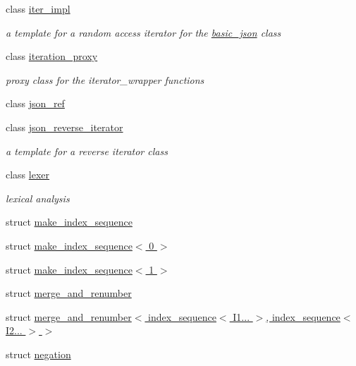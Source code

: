 \begin{DoxyCompactItemize}
\item 
class \hyperlink{classnlohmann_1_1detail_1_1iter__impl}{iter\+\_\+impl}
\begin{DoxyCompactList}\small\item\em a template for a random access iterator for the \hyperlink{classnlohmann_1_1basic__json}{basic\+\_\+json} class \end{DoxyCompactList}\item 
class \hyperlink{classnlohmann_1_1detail_1_1iteration__proxy}{iteration\+\_\+proxy}
\begin{DoxyCompactList}\small\item\em proxy class for the iterator\+\_\+wrapper functions \end{DoxyCompactList}\item 
class \hyperlink{classnlohmann_1_1detail_1_1json__ref}{json\+\_\+ref}
\item 
class \hyperlink{classnlohmann_1_1detail_1_1json__reverse__iterator}{json\+\_\+reverse\+\_\+iterator}
\begin{DoxyCompactList}\small\item\em a template for a reverse iterator class \end{DoxyCompactList}\item 
class \hyperlink{classnlohmann_1_1detail_1_1lexer}{lexer}
\begin{DoxyCompactList}\small\item\em lexical analysis \end{DoxyCompactList}\item 
struct \hyperlink{structnlohmann_1_1detail_1_1make__index__sequence}{make\+\_\+index\+\_\+sequence}
\item 
struct \hyperlink{structnlohmann_1_1detail_1_1make__index__sequence_3_010_01_4}{make\+\_\+index\+\_\+sequence$<$ 0 $>$}
\item 
struct \hyperlink{structnlohmann_1_1detail_1_1make__index__sequence_3_011_01_4}{make\+\_\+index\+\_\+sequence$<$ 1 $>$}
\item 
struct \hyperlink{structnlohmann_1_1detail_1_1merge__and__renumber}{merge\+\_\+and\+\_\+renumber}
\item 
struct \hyperlink{structnlohmann_1_1detail_1_1merge__and__renumber_3_01index__sequence_3_01I1_8_8_8_01_4_00_01inde4885d6f1d93a04f25932afbd429c4793}{merge\+\_\+and\+\_\+renumber$<$ index\+\_\+sequence$<$ I1... $>$, index\+\_\+sequence$<$ I2... $>$ $>$}
\item 
struct \hyperlink{structnlohmann_1_1detail_1_1negation}{negation}
\item 

\end{DoxyCompactItemize}

